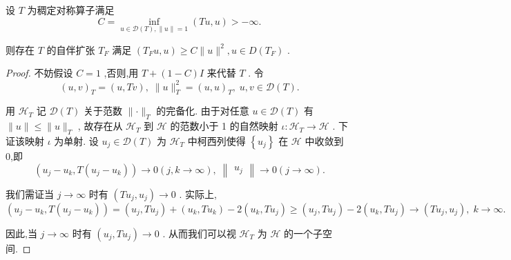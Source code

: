 \documentclass[lang=cn,newtx,10pt,scheme=chinese,thmcnt=chapter]{elegantbook}
\begin{document}
\begin{theorem}
    设 \(T\) 为稠定对称算子满足
\begin{equation*}
C = \mathop{\inf }\limits_{{u \in  \mathcal{D}(T) ,\parallel u\parallel  = 1}}\left( {{Tu},u}\right)  >  - \infty .
\end{equation*}

则存在 \(T\) 的自伴扩张 \({T}_{F}\) 满足 \(\left( {{T}_{F}u,u}\right)  \geq  C\parallel u{\parallel }^{2},u \in  D\left( {T}_{F}\right)\) .

\end{theorem}
\begin{proof}
    不妨假设 \(C = 1\) ,否则,用 \(T + \left( {1 - C}\right) I\) 来代替 \(T\) . 令
\begin{equation*}
{\left( u,v\right) }_{T} = \left( {u,{Tv}}\right) ,\;\parallel u{\parallel }_{T}^{2} = {\left( u,u\right) }_{T},\;u,v \in  \mathcal{D}(T) .
\end{equation*}

用 \({\mathcal{H}}_{T}\) 记 \(\mathcal{D}(T)\) 关于范数 \(\parallel  \cdot  {\parallel }_{T}\) 的完备化. 由于对任意 \(u \in  \mathcal{D}(T)\) 有 \(\parallel u\parallel  \leq  \parallel u{\parallel }_{T}\) , 故存在从 \({\mathcal{H}}_{T}\) 到 \(\mathcal{H}\) 的范数小于 1 的自然映射 \(\iota  : {\mathcal{H}}_{T} \rightarrow  \mathcal{H}\) . 下证该映射 \(\iota\) 为单射. 设 \({u}_{j} \in  \mathcal{D}(T)\) 为 \({\mathcal{H}}_{T}\) 中柯西列使得 \(\left\{  {u}_{j}\right\}\) 在 \(\mathcal{H}\) 中收敛到 0,即
\begin{equation*}
\left( {{u}_{j} - {u}_{k},T\left( {{u}_{j} - {u}_{k}}\right) }\right)  \rightarrow  0\left( {j,k \rightarrow  \infty }\right) ,\;\begin{Vmatrix}{u}_{j}\end{Vmatrix} \rightarrow  0\left( {j \rightarrow  \infty }\right) .
\end{equation*}

我们需证当 \(j \rightarrow  \infty\) 时有 \(\left( {T{u}_{j},{u}_{j}}\right)  \rightarrow  0\) . 实际上,
\begin{equation*}
\left( {{u}_{j} - {u}_{k},T\left( {{u}_{j} - {u}_{k}}\right) }\right)  = \left( {{u}_{j},T{u}_{j}}\right)  + \left( {{u}_{k},T{u}_{k}}\right)  - 2\left( {{u}_{k},T{u}_{j}}\right)
\geq  \left( {{u}_{j},T{u}_{j}}\right)  - 2\left( {{u}_{k},T{u}_{j}}\right)\rightarrow  \left( {T{u}_{j},{u}_{j}}\right) ,\;k \rightarrow  \infty .
\end{equation*}

因此,当 \(j \rightarrow  \infty\) 时有 \(\left( {{u}_{j},T{u}_{j}}\right)  \rightarrow  0\) . 从而我们可以视 \({\mathcal{H}}_{T}\) 为 \(\mathcal{H}\) 的一个子空间.

\end{proof}
\end{document}
